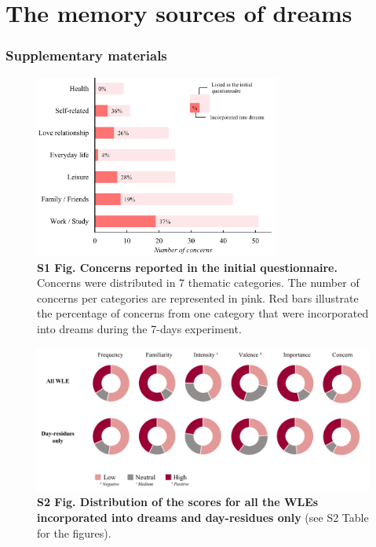 \cleardoublepage

\chapter{The memory sources of dreams}
\label{res:wle}

\cleardoublepage



\cleardoublepage

\subsection*{Supplementary materials}
\label{res:wle:supp}
\vspace*{1cm}

\begin{figure}[htbp]
	\includegraphics[width=0.72\textwidth]{Fig/Results/WLE/S1_Fig.png}
	\caption*{\textbf{S1 Fig. Concerns reported in the initial questionnaire.} Concerns were distributed in 7 thematic categories. The number of concerns per categories are represented in pink. Red bars illustrate the percentage of concerns from one category that were incorporated into dreams during the 7-days experiment.}
\end{figure}

\vspace*{3cm}

\begin{figure}[htbp]
	\includegraphics[width=\textwidth]{Fig/Results/WLE/S2_Fig.png}
	\caption*{\textbf{S2 Fig. Distribution of the scores for all the WLEs incorporated into dreams and day-residues only} (see S2 Table for the figures).}
\end{figure}


